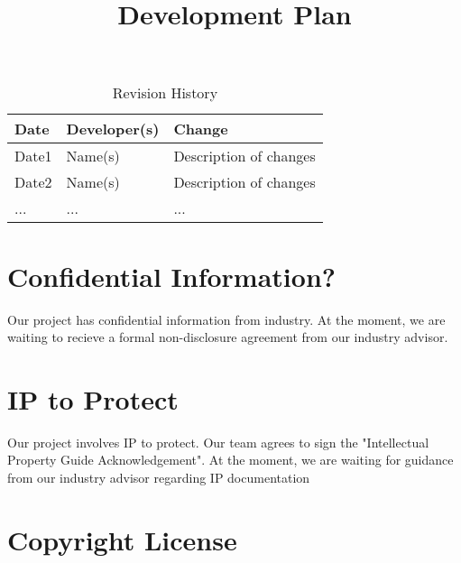 \documentclass{article}
\title{Development Plan\\\progname}
\author{\authname}
\date{}
\begin{document}
\maketitle

\begin{table}[hp]
\caption{Revision History} \label{TblRevisionHistory}
\begin{tabularx}{\textwidth}{llX}
\toprule
\textbf{Date} & \textbf{Developer(s)} & \textbf{Change}\\
\midrule
Date1 & Name(s) & Description of changes\\
Date2 & Name(s) & Description of changes\\
... & ... & ...\\
\bottomrule
\end{tabularx}
\end{table}

\newpage{}



\section{Confidential Information?}

Our project has confidential information from industry. At the moment, we are waiting to recieve a formal non-disclosure agreement from our industry advisor.

\section{IP to Protect}

Our project involves IP to protect. Our team agrees to sign the "Intellectual Property Guide Acknowledgement". At the moment, we are waiting for guidance from our industry advisor regarding IP documentation

\section{Copyright License}

\end{document}
